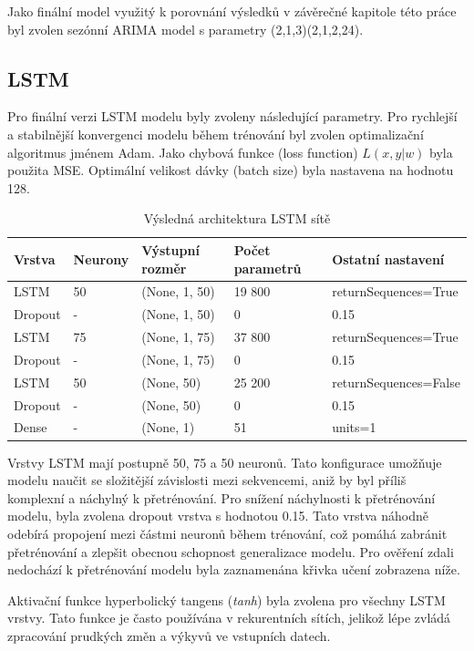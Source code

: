 \documentclass[FM,BP,fonts]{tulthesis}
\begin{document}
Jako finální model využitý k porovnání výsledků v závěrečné kapitole této práce byl zvolen sezónní ARIMA model s parametry (2,1,3)(2,1,2,24). 


\subsection{LSTM}
Pro finální verzi LSTM modelu byly zvoleny následující parametry. Pro rychlejší a stabilnější konvergenci modelu během trénování byl zvolen optimalizační algoritmus jménem Adam. Jako chybová funkce (loss function) $L(x,y|w)$ byla použita MSE. 
Optimální velikost dávky (batch size) byla nastavena na hodnotu 128. 

\begin{table}[!ht]
	\centering
	\caption{Výsledná architektura LSTM sítě}
	
	\begin{tabularx}{\linewidth}{llXXX}
		\hline
		\textbf{Vrstva} & \textbf{Neurony} & \textbf{Výstupní rozměr} & \textbf{Počet parametrů} & \textbf{Ostatní nastavení} \\ \hline
		LSTM & 50 & (None, 1, 50) & 19 800 & returnSequences=True \\
		Dropout & - & (None, 1, 50) & 0 & 0.15 \\
		LSTM  & 75 & (None, 1, 75) & 37 800 & returnSequences=True \\
		Dropout & - & (None, 1, 75) & 0 & 0.15 \\
		LSTM   & 50 & (None, 50) & 25 200 & returnSequences=False \\
		Dropout & - & (None, 50) & 0 & 0.15 \\
		Dense & - & (None, 1) & 51 & units=1 \\
		
		
	\end{tabularx}
\end{table}

Vrstvy LSTM mají postupně 50, 75 a 50 neuronů. Tato konfigurace umožňuje modelu naučit se složitější závislosti mezi sekvencemi, aniž by byl příliš komplexní a náchylný k přetrénování. Pro snížení náchylnosti k přetrénování modelu, byla zvolena dropout vrstva s hodnotou 0.15. Tato vrstva náhodně odebírá propojení mezi částmi neuronů během trénování, což pomáhá zabránit přetrénování a zlepšit obecnou schopnost generalizace modelu. Pro ověření zdali nedochází k přetrénování modelu byla zaznamenána křivka učení zobrazena níže.

Aktivační funkce hyperbolický tangens (\textit{tanh}) byla zvolena pro všechny LSTM vrstvy. Tato funkce je často používána v rekurentních sítích, jelikož lépe zvládá zpracování prudkých změn a výkyvů ve vstupních datech. \cite{SHEN2022117181}
\end{document}
